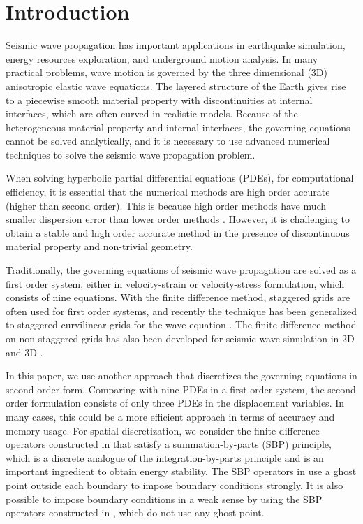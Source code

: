 \section{Introduction}
Seismic wave propagation has important applications in earthquake simulation, energy resources exploration, and underground motion analysis. In many practical problems, wave motion is governed by the three dimensional (3D) anisotropic elastic wave equations. The layered structure of the Earth gives rise to a piecewise smooth material property with discontinuities at internal interfaces, which are often curved in realistic models. Because of the heterogeneous material property and internal interfaces, the governing equations cannot be solved analytically, and it is necessary to use advanced numerical techniques to solve the seismic wave propagation problem.

When solving hyperbolic partial differential equations (PDEs), for computational efficiency, it is essential that the numerical methods are high order accurate (higher than second order). This is because high order methods have much smaller dispersion error than lower order methods \cite{Hagstrom2012,Kreiss1972}. However, it is challenging to obtain a stable and high order accurate method in the presence of discontinuous material property and non-trivial geometry. 

Traditionally, the governing equations of seismic wave propagation are solved as a first order system, either in velocity-strain or velocity-stress formulation, which consists of nine equations. With the finite difference method, staggered grids are often used for first order systems, and recently the technique has been generalized to staggered curvilinear grids for the wave equation \cite{OReilly2020}. The finite difference method on non-staggered grids has also been developed for seismic wave simulation in 2D \cite{Kozdon2013} and 3D \cite{Duru2016}.

In this paper, we use another approach that discretizes the governing equations in second order form. Comparing with nine PDEs in a first order system, the second order formulation consists of only three PDEs in the displacement variables. In many cases, this could be a more efficient approach in terms of accuracy and memory usage. For spatial discretization, we consider the finite difference operators constructed in \cite{sjogreen2012fourth} that satisfy a summation-by-parts (SBP) principle, which is a discrete analogue of the integration-by-parts principle and is an important ingredient to obtain energy stability. The SBP operators in \cite{sjogreen2012fourth} use a ghost point outside each boundary to impose boundary conditions strongly. It is also possible to impose boundary conditions in a weak sense \cite{Carpenter1994} by using the SBP operators constructed in \cite{Mattsson2012}, which do not use any ghost point.

